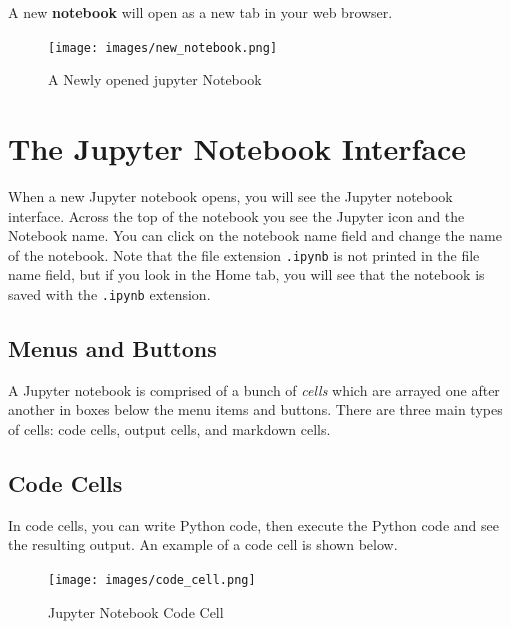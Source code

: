 \documentclass{book}
\begin{document}
A new \textbf{notebook} will open as a new tab in your web browser.

\begin{figure}
\centering
\texttt{[image: images/new\_notebook.png]}
\caption{A Newly opened jupyter Notebook}
\end{figure}
    




    
        \section{The Jupyter Notebook
Interface}\label{the-jupyter-notebook-interface}
    




    
        When a new Jupyter notebook opens, you will see the Jupyter notebook
interface. Across the top of the notebook you see the Jupyter icon and
the Notebook name. You can click on the notebook name field and change
the name of the notebook. Note that the file extension
\lstinline!.ipynb! is not printed in the file name field, but if you
look in the Home tab, you will see that the notebook is saved with the
\lstinline!.ipynb! extension.
    




    
        \subsection{Menus and Buttons}\label{menus-and-buttons}

A Jupyter notebook is comprised of a bunch of \emph{cells} which are
arrayed one after another in boxes below the menu items and buttons.
There are three main types of cells: code cells, output cells, and
markdown cells.
    




    
        \subsection{Code Cells}\label{code-cells}

In code cells, you can write Python code, then execute the Python code
and see the resulting output. An example of a code cell is shown below.

\begin{figure}
\centering
\texttt{[image: images/code\_cell.png]}
\caption{Jupyter Notebook Code Cell}
\end{figure}
\end{document}

